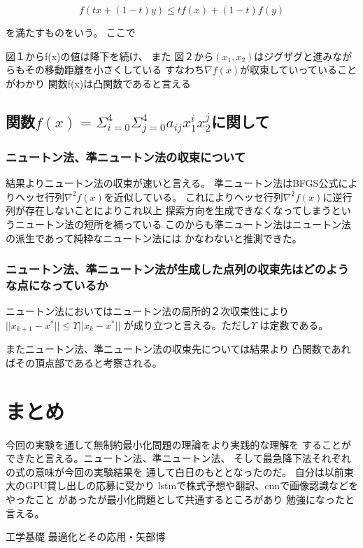 \documentclass{jsarticle}
\begin{document}
$$
f(tx + (1 - t)y) \leq tf(x) + (1 - t)f(y)
$$

を満たすものをいう。
ここで

図１からf(x)の値は降下を続け、
また
図２から$(x_1, x_2)$はジグザグと進みながらもその移動距離を小さくしている
すなわち$\nabla f(x)$が収束していっていることがわかり
関数f(x)は凸関数であると言える

\subsection{関数$f(x) = {\Sigma}^{4}_{i=0}{\Sigma}^{4}_{j=0} a_{ij} x^{i}_{1} x^{j}_{2}$に関して}
\subsubsection{ニュートン法、準ニュートン法の収束について}
結果よりニュートン法の収束が速いと言える。
準ニュートン法はBFGS公式によりヘッセ行列${\nabla}^2 f(x)$を近似している。
これによりヘッセ行列${\nabla}^2 f(x)$に逆行列が存在しないことによりこれ以上
探索方向を生成できなくなってしまうというニュートン法の短所を補っている
このからも準ニュートン法はニュートン法の派生であって純粋なニュートン法には
かなわないと推測できた。

\subsubsection{ニュートン法、準ニュートン法が生成した点列の収束先はどのような点になっているか}
ニュートン法においてはニュートン法の局所的２次収束性により
$||x_{k+1} - x^{\ast}|| \leq \Upsilon ||x_{k} - x^{\ast}||$  
が成り立つと言える。ただし$\Upsilon$ は定数である。


またニュートン法、準ニュートン法の収束先については結果より
凸関数であればその頂点部であると考察される。

\section{まとめ}
今回の実験を通して無制約最小化問題の理論をより実践的な理解を
することができたと言える。ニュートン法、準ニュートン法、
そして最急降下法それぞれの式の意味が今回の実験結果を
通して白日のもととなったのだ。
自分は以前東大のGPU貸し出しの応募に受かり
lstmで株式予想や翻訳、cnnで画像認識などをやったこと
があったが最小化問題として共通するところがあり
勉強になったと言える。 

\begin{thebibliography}{9}
   工学基礎 最適化とその応用・矢部博
\end{thebibliography}
\end{document}
